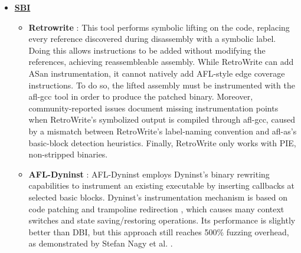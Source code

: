 \begin{itemize}
\begin{itemize}
                    \item \textbf{DynamoRIO/Pin} \cite{DynamoRIOPaper,PinPaper}: Both these approaches share the same basic principle, called
                    \textbf{\gls{JIT} code caching}. This consists in taking control of the thread when the target application starts,
                    and from that moment on, every \gls{BB} is intercepted before it is executed and is copied into a private \textbf{Code Cache}.
                    The instrumentation is then added to the copy, and control is transferred to the code cache.
                    The instrumentation process is more or less identical to FRIDA's Stalker mechanism, but is not as optimized.
                    Also in this case, the implemented version uses AFL \cite{zalewski2017afl} as the fuzzer \cite{heuse2018afldynamorio,heuse2018aflpin}.
            \end{itemize}
                \item \underline{\textbf{\gls{SBI}}}
                \begin{itemize}
                    \item \textbf{Retrowrite} \cite{retrowrite}: This tool performs symbolic lifting on the code, replacing every reference
                        discovered during disassembly with a symbolic label. Doing this allows instructions to be added without
                        modifying the references, achieving reassembleable assembly.
                        While RetroWrite can add ASan instrumentation, it cannot natively add AFL-style edge coverage instructions.
                        To do so, the lifted assembly must be instrumented with the afl-gcc tool in order to produce the patched binary.
                        Moreover, community-reported issues \cite{retrowrite_issue28} document missing instrumentation points when
                        RetroWrite's symbolized output is compiled through afl-gcc, caused by a mismatch between RetroWrite's
                        label-naming convention and afl-as's basic-block detection heuristics.
                        Finally, RetroWrite only works with PIE, non-stripped binaries.
                    \item \textbf{AFL-Dyninst} \cite{afldyninst}: AFL-Dyninst employs Dyninst's binary rewriting capabilities
                            to instrument an existing executable by inserting callbacks at selected basic blocks.
                            Dyninst's instrumentation mechanism is based on code patching and trampoline redirection \cite{Dyninst},
                            which causes many context switches and state saving/restoring operations.
                            Its performance is slightly better than \gls{DBI}, but this approach still reaches 500\% fuzzing overhead,
                            as demonstrated by Stefan Nagy et al. \cite{zafl}.


\end{itemize}
\end{itemize}
